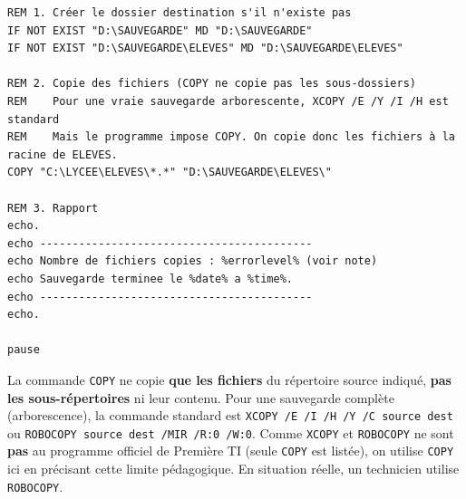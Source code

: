 \documentclass[11pt]{article}
\begin{document}
\begin{exoresolu}
\begin{lstlisting}
REM 1. Créer le dossier destination s'il n'existe pas
IF NOT EXIST "D:\SAUVEGARDE" MD "D:\SAUVEGARDE"
IF NOT EXIST "D:\SAUVEGARDE\ELEVES" MD "D:\SAUVEGARDE\ELEVES"

REM 2. Copie des fichiers (COPY ne copie pas les sous-dossiers)
REM    Pour une vraie sauvegarde arborescente, XCOPY /E /Y /I /H est standard
REM    Mais le programme impose COPY. On copie donc les fichiers à la racine de ELEVES.
COPY "C:\LYCEE\ELEVES\*.*" "D:\SAUVEGARDE\ELEVES\"

REM 3. Rapport
echo.
echo ------------------------------------------
echo Nombre de fichiers copies : %errorlevel% (voir note)
echo Sauvegarde terminee le %date% a %time%.
echo ------------------------------------------
echo.

pause
\end{lstlisting}

\begin{attention}
La commande \texttt{COPY} ne copie \textbf{que les fichiers} du répertoire source indiqué, \textbf{pas les sous-répertoires} ni leur contenu. Pour une sauvegarde complète (arborescence), la commande standard est \texttt{XCOPY /E /I /H /Y /C source dest} ou \texttt{ROBOCOPY source dest /MIR /R:0 /W:0}. Comme \texttt{XCOPY} et \texttt{ROBOCOPY} ne sont \textbf{pas} au programme officiel de Première TI (seule \texttt{COPY} est listée), on utilise \texttt{COPY} ici en précisant cette limite pédagogique. En situation réelle, un technicien utilise \texttt{ROBOCOPY}.
\end{attention}


\end{exoresolu}
\end{document}
